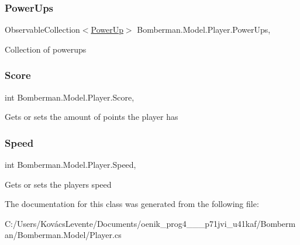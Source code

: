 \subsubsection{\texorpdfstring{PowerUps}{PowerUps}}
{\footnotesize\ttfamily Observable\+Collection$<$\mbox{\hyperlink{namespace_bomberman_1_1_model_a698c97744bc885fe16cc6f385fc501ef}{Power\+Up}}$>$ Bomberman.\+Model.\+Player.\+Power\+Ups\hspace{0.3cm}{\ttfamily [get]}, {\ttfamily [set]}}



Collection of powerups 

\mbox{\label{class_bomberman_1_1_model_1_1_player_a82d136aad5ff0fb6709a8a41cde5e7fc}} 
\subsubsection{\texorpdfstring{Score}{Score}}
{\footnotesize\ttfamily int Bomberman.\+Model.\+Player.\+Score\hspace{0.3cm}{\ttfamily [get]}, {\ttfamily [set]}}



Gets or sets the amount of points the player has 

\mbox{\label{class_bomberman_1_1_model_1_1_player_a72a4cfd9b2ad1321d2945a056940df5c}} 
\subsubsection{\texorpdfstring{Speed}{Speed}}
{\footnotesize\ttfamily int Bomberman.\+Model.\+Player.\+Speed\hspace{0.3cm}{\ttfamily [get]}, {\ttfamily [set]}}



Gets or sets the player\textquotesingle{}s speed 



The documentation for this class was generated from the following file\+:\begin{DoxyCompactItemize}
\item 
C\+:/\+Users/\+Kovács\+Levente/\+Documents/oenik\+\_\+prog4\+\_\+\_\+\_\+p71jvi\+\_\+u41kaf/\+Bomberman/\+Bomberman.\+Model/Player.\+cs\end{DoxyCompactItemize}
